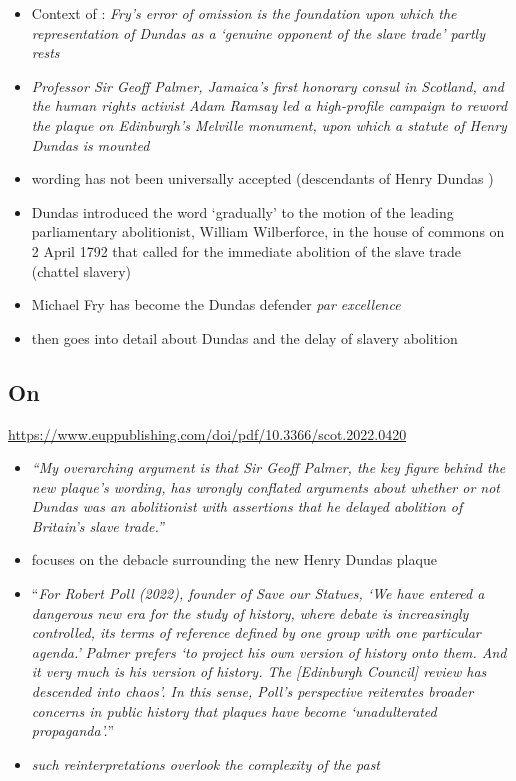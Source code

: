 \begin{itemize}
    \item Context of \cite{fry_1992}: \textit{Fry’s error of omission is the foundation upon which the representation of Dundas as a ‘genuine opponent of the slave trade’ partly rests}
    \item \textit{Professor Sir Geoff Palmer, Jamaica’s first honorary consul in Scotland, and the human rights activist Adam Ramsay led a high-profile campaign to reword the plaque on Edinburgh’s Melville monument, upon which a statute of Henry Dundas is mounted}
    \item wording has not been universally accepted (descendants of Henry Dundas )
    \item Dundas introduced the word ‘gradually’ to the motion of the leading parliamentary abolitionist, William Wilberforce, in the house of commons on 2 April 1792 that called for the immediate abolition of the slave trade (chattel slavery)
    \item Michael Fry has become the Dundas defender \textit{par excellence}
    \item then goes into detail about Dundas and the delay of slavery abolition

\end{itemize}

\subsection{On \cite{mccarthy_2022_1}}

\url{https://www.euppublishing.com/doi/pdf/10.3366/scot.2022.0420}

\begin{itemize}
    \item \textit{``My overarching argument is that Sir Geoff Palmer, the key figure behind the new plaque’s wording, has wrongly conflated arguments about whether or not Dundas was an abolitionist with assertions that he delayed abolition of Britain’s slave trade.''}
    \item focuses on the debacle surrounding the new Henry Dundas plaque
    \item ``\textit{For Robert Poll (2022), founder of Save our Statues, ‘We have entered a dangerous new era for the study of history, where debate is increasingly controlled, its terms of reference defined by one group with one particular agenda.’ }\textit{Palmer prefers ‘to project his own version of history onto them. And it very much is his version of history. The [Edinburgh Council] review has descended into chaos’. In this sense, Poll’s perspective reiterates broader concerns in public history that plaques have become ‘unadulterated propaganda’.}''
    \item \textit{such reinterpretations overlook the complexity of the past}
\end{itemize}

